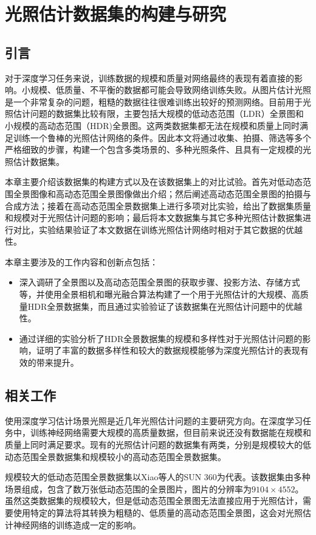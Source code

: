 \chapter{光照估计数据集的构建与研究}\label{chap:dataset}
\section{引言}
对于深度学习任务来说，训练数据的规模和质量对网络最终的表现有着直接的影响。小规模、低质量、不平衡的数据都可能会导致网络训练失败。从图片估计光照是一个非常复杂的问题，粗糙的数据往往很难训练出较好的预测网络。目前用于光照估计问题的数据集比较有限，主要包括大规模的低动态范围（LDR）全景图和小规模的高动态范围（HDR)全景图。这两类数据集都无法在规模和质量上同时满足训练一个鲁棒的光照估计网络的条件。因此本文将通过收集、拍摄、筛选等多个严格细致的步骤，构建一个包含多类场景的、多种光照条件、且具有一定规模的光照估计数据集。

本章主要介绍该数据集的构建方式以及在该数据集上的对比试验。首先对低动态范围全景图像和高动态范围全景图像做出介绍；然后阐述高动态范围全景图的拍摄与合成方法；接着在高动态范围全景数据集上进行多项对比实验，给出了数据集质量和规模对于光照估计问题的影响；最后将本文数据集与其它多种光照估计数据集进行对比，实验结果验证了本文数据在训练光照估计网络时相对于其它数据的优越性。

本章主要涉及的工作内容和创新点包括：
\begin{itemize}
    \item 深入调研了全景图以及高动态范围全景图的获取步骤、投影方法、存储方式等，并使用全景相机和曝光融合算法构建了一个用于光照估计的大规模、高质量HDR全景数据集，而且通过实验验证了该数据集在光照估计问题中的优越性。
    \item 通过详细的实验分析了HDR全景数据集的规模和多样性对于光照估计问题的影响，证明了丰富的数据多样性和较大的数据规模能够为深度光照估计的表现有效的带来提升。
\end{itemize}
\section{相关工作}
使用深度学习估计场景光照是近几年光照估计问题的主要研究方向。在深度学习任务中，训练神经网络需要大规模的高质量数据，但目前来说还没有数据能在规模和质量上同时满足要求。现有的光照估计问题的数据集有两类，分别是规模较大的低动态范围全景数据集和规模较小的高动态范围全景数据集。

规模较大的低动态范围全景数据集以Xiao等人的SUN 360\cite{xiao2012recognizing}为代表。该数据集由多种场景组成，包含了数万张低动态范围的全景图片，图片的分辨率为$9104\times4552$。虽然这类数据集的规模较大，但是低动态范围全景图无法直接应用于光照估计，需要使用特定的算法将其转换为粗糙的、低质量的高动态范围全景图，这会对光照估计神经网络的训练造成一定的影响。

